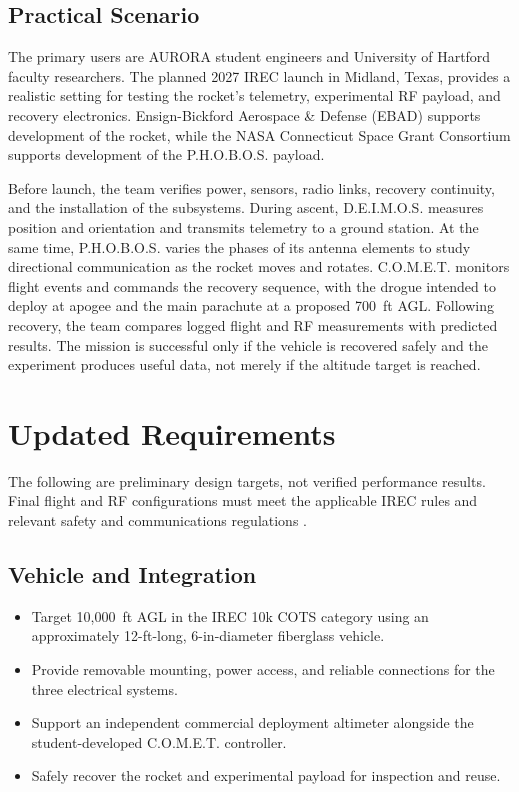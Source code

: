 \documentclass[11pt]{IEEEtran}
\newcommand{\comet}{C.O.M.E.T.}
\newcommand{\phobos}{P.H.O.B.O.S.}
\newcommand{\deimos}{D.E.I.M.O.S.}
\begin{document}
\subsection{Practical Scenario}
The primary users are AURORA student engineers and University of Hartford faculty researchers. The planned 2027 IREC launch in Midland, Texas, provides a realistic setting for testing the rocket's telemetry, experimental RF payload, and recovery electronics. Ensign-Bickford Aerospace \& Defense (EBAD) supports development of the rocket, while the NASA Connecticut Space Grant Consortium supports development of the \phobos{} payload.

Before launch, the team verifies power, sensors, radio links, recovery continuity, and the installation of the subsystems. During ascent, \deimos{} measures position and orientation and transmits telemetry to a ground station. At the same time, \phobos{} varies the phases of its antenna elements to study directional communication as the rocket moves and rotates. \comet{} monitors flight events and commands the recovery sequence, with the drogue intended to deploy at apogee and the main parachute at a proposed 700~ft AGL. Following recovery, the team compares logged flight and RF measurements with predicted results. The mission is successful only if the vehicle is recovered safely and the experiment produces useful data, not merely if the altitude target is reached.

\section{Updated Requirements}
The following are preliminary design targets, not verified performance results. Final flight and RF configurations must meet the applicable IREC rules and relevant safety and communications regulations \cite{irecRules,fcc15247,faaRockets}.

\subsection{Vehicle and Integration}
\begin{itemize}
\item Target 10,000~ft AGL in the IREC 10k COTS category using an approximately 12-ft-long, 6-in-diameter fiberglass vehicle.
\item Provide removable mounting, power access, and reliable connections for the three electrical systems.
\item Support an independent commercial deployment altimeter alongside the student-developed \comet{} controller.
\item Safely recover the rocket and experimental payload for inspection and reuse.
\end{itemize}
\end{document}

